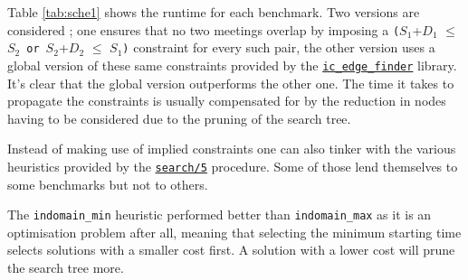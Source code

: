 Table \ref{tab:sche1} shows the runtime for each benchmark. Two versions are considered ; one ensures that no two meetings overlap by imposing a \texttt{(}$S_1$+$D_1$ $\leq$ $S_2$\ \texttt{or}\ $S_2$+$D_2$ $\leq$ $S_1$\texttt{)} constraint for every such pair, the other version uses a global version of these same constraints provided by the \href{http://eclipseclp.org/doc/bips/lib/ic_edge_finder/index.html}{\texttt{ic\_edge\_finder}} library. It's clear that the global version outperforms the other one. The time it takes to propagate the constraints is usually compensated for by the reduction in nodes having to be considered due to the pruning of the search tree.\\\par

Instead of making use of implied constraints one can also tinker with the various heuristics provided by the \href{http://eclipseclp.org/doc/bips/lib/ic/search-6.html}{\texttt{search/5}} procedure. Some of those lend themselves to some benchmarks but not to others.\par
The \texttt{indomain\_min} heuristic performed better than \texttt{indomain\_max} as it is an optimisation problem after all, meaning that selecting the minimum starting time selects solutions with a smaller cost first. A solution with a lower cost will prune the search tree more.

